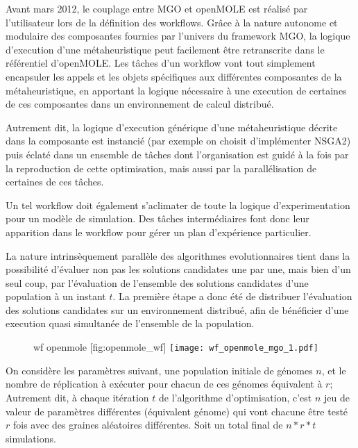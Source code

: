Avant mars 2012, le couplage entre MGO et openMOLE est réalisé par l'utilisateur lors de la définition des workflows. Grâce à la nature autonome et modulaire des composantes fournies par l'univers du framework MGO, la logique d'execution d'une métaheuristique peut facilement être retranscrite dans le référentiel d'openMOLE. Les tâches d'un workflow vont tout simplement encapsuler les appels et les objets spécifiques aux différentes composantes de la métaheuristique, en apportant la logique nécessaire à une execution de certaines de ces composantes dans un environnement de calcul distribué.

Autrement dit, la logique d'execution générique d'une métaheuristique décrite dans la composante  est instancié (par exemple on choisit d'implémenter NSGA2) puis éclaté dans un ensemble de tâches dont l'organisation est guidé à la fois par la reproduction de cette optimisation, mais aussi par la parallélisation de certaines de ces tâches.

Un tel workflow doit également s'aclimater de toute la logique d'experimentation pour un modèle de simulation. Des tâches intermédiaires font donc leur apparition dans le workflow pour gérer un plan d'expérience particulier.

La nature intrinsèquement parallèle des algorithmes evolutionnaires tient dans la possibilité d'évaluer non pas les solutions candidates une par une, mais bien d'un seul coup, par l'évaluation de l'ensemble des solutions candidates d'une population à un instant $t$. La première étape a donc été de distribuer l'évaluation des solutions candidates sur un environnement distribué, afin de bénéficier d'une execution quasi simultanée de l'ensemble de la population.

\begin{figure}[H]
	\begin{sidecaption}[fortoc]{wf openmole }[fig:openmole_wf]
		\centering
		\texttt{[image: wf\_openmole\_mgo\_1.pdf]}{
		}
  \end{sidecaption}
\end{figure}

On considère les paramètres suivant, une population initiale de génomes $n$, et le nombre de réplication à exécuter pour chacun de ces génomes équivalent à $r$; Autrement dit, à chaque itération $t$ de l'algorithme d'optimisation, c'est $n$ jeu de valeur de paramètres différentes (équivalent génome) qui vont chacune être testé $r$ fois avec des graines aléatoires différentes. Soit un total final de $n * r * t$ simulations.

